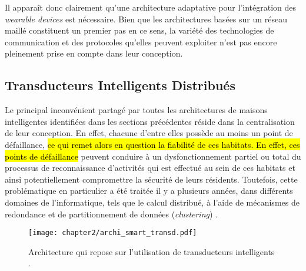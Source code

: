 Il apparaît donc clairement qu'une architecture adaptative pour l'intégration des \textit{wearable devices} est nécessaire. Bien que les architectures basées sur un réseau maillé constituent un premier pas en ce sens, la variété des technologies de communication et des protocoles qu'elles peuvent exploiter n'est pas encore pleinement prise en compte dans leur conception.

\subsection{Transducteurs Intelligents Distribués}

Le principal inconvénient partagé par toutes les architectures de maisons intelligentes identifiées dans les sections précédentes réside dans la centralisation de leur conception. En effet, chacune d'entre elles possède au moins un point de défaillance, \hl{ce qui remet alors en question la fiabilité de ces habitats. En effet, ces points de défaillance} peuvent conduire à un dysfonctionnement partiel ou total du processus de reconnaissance d'activités qui est effectué au sein de ces habitats et ainsi potentiellement compromettre la sécurité de leurs résidents. Toutefois, cette problématique en particulier a été traitée il y a plusieurs années, dans différents domaines de l'informatique, tels que le calcul distribué, à l'aide de mécanismes de redondance et de partitionnement de données (\textit{clustering}) \citep{Dikaiakos2009,Zaharia2010,JafarnejadGhomi2017}.

\begin{figure}[H]
	\centering
	\texttt{[image: chapter2/archi\_smart\_transd.pdf]}
	\caption[Architecture qui repose sur l'utilisation de transducteurs intelligents.]{Architecture qui repose sur l'utilisation de transducteurs intelligents \citep{Plantevin2018}.}
	\label{fig:archi_smart_transd}
\end{figure}

